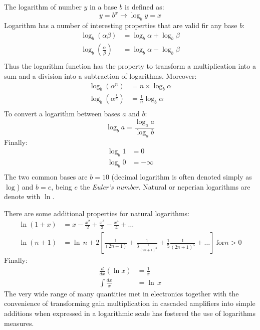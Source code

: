 The logarithm of number $y$ in a base $b$ is defined as:
\begin{equation}
y = b^x \longrightarrow \log_b y = x
\end{equation}
Logarithm has a number of interesting properties that are valid fir any base $b$:
\begin{equation}
\begin{split}
\log_b(\alpha\beta) & = \log_b\alpha + \log_b\beta\\
\log_b\left(\frac{\alpha}{\beta}\right) &= \log_b\alpha - \log_b\beta\\
\end{split}
\end{equation}
Thus the logarithm function has the property to transform a multiplication into a sum and a division into a subtraction of logarithms. Moreover:
\begin{equation}
\begin{split}
\log_b(\alpha^n) & = n\times\log_b\alpha\\
\log_b\left(\alpha^\frac{1}{n}\right) &= \frac{1}{n}\log_b\alpha\\
\end{split}
\end{equation}
To convert a logarithm between bases $a$ and $b$:
\begin{equation}
\log_ba=\frac{\log_aa}{\log_ab}
\end{equation}
Finally:
\begin{equation}
\begin{split}
\log_b1 &= 0\\
\log_b0 &= -\infty\\
\end{split}
\end{equation}
The two common bases are $b=10$ (decimal logarithm is often denoted simply as $\log$) and $b=e$, being $e$ the \emph{Euler's number}. Natural or neperian logarithms are denote with $\ln$.

There are some additional properties for natural logarithms:
\begin{equation}
\begin{split}
\ln(1 + x) & = x -\frac{x^2}{2} +\frac{x^3}{3} -\frac{x^4}{4}+ \ldots\\
\ln(n + 1) & = \ln\,n+2\left[\frac{1}{(2n+1)}+\frac{1}{3\frac{1}{(2n+1)^3}}+\frac{1}{5}\frac{1}{(2n+1)^5} +\ldots\right]~\textrm{for} n > 0
\end{split}
\end{equation}
Finally:
\begin{equation}
\begin{split}
\frac{d}{dx}\left(\ln x\right) &= \frac{1}{x}\\
\int\frac{dx}{x} & = \ln\,x
\end{split}
\end{equation}
The very wide range of many quantities met in electronics together with the convenience of transforming gain multiplication in cascaded amplifiers into simple additions when expressed in a logarithmic scale has fostered the use of logarithms measures.

